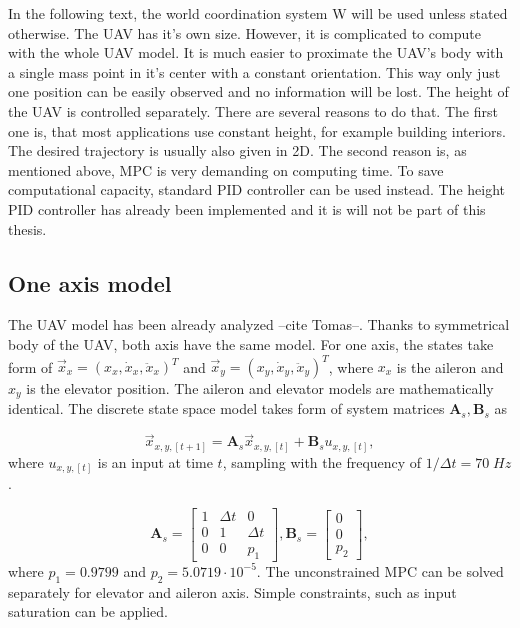 \documentclass{article}
\begin{document}
In the following text, the world coordination system W will be used unless stated otherwise. 
The UAV has it's own size. However, it is complicated to compute with the whole UAV model. It is much easier to proximate the UAV's body with a single mass point in it's center with a constant orientation. This way only just one position can be easily observed and no information will be lost.  The height of the UAV is controlled separately. There are several reasons to do that. The first one is, that most applications use constant height, for example building interiors. The desired trajectory is usually also given in 2D. The second reason is, as mentioned above, MPC is very demanding on computing time. To save computational capacity, standard PID controller can be used instead. The height PID controller has already been implemented \cite{tomas} and it is will not be part of this thesis. 

\subsection{One axis model}
The UAV model has been already analyzed --cite Tomas--. Thanks to symmetrical body of the UAV, both axis have the same model. For one axis, the states take form of 
$\vec{x}_x = (x_x, \dot{x}_x, \ddot{x}_x)^T$ and $\vec{x}_y = (x_y, \dot{x}_y, \ddot{x}_y)^T$, where $x_x$ is the aileron and $x_y$ is the elevator position. The aileron and elevator models are mathematically identical. The discrete state space model takes form of system matrices $\textbf{A}_s, \textbf{B}_s$ as

\begin{equation}
\label{eq:state_space_model_simple}
\vec{x}_{x,y,[t+1]} = \textbf{A}_{s} \vec{x}_{x,y, [t]} +\textbf{B}_{s} u_{x,y, [t]},
\end{equation} 
where $u_{x,y,[t]}$ is an input at time $t$, sampling with the frequency of $1/\Delta t = 70\;Hz$.




\begin{equation}
\textbf{A}_{s} =
  \begin{bmatrix}
  1 & \Delta t & 		0 \\
  0 & 		 1 & \Delta t \\
  0	& 		 0 &		p_1
  \end{bmatrix},\textbf{B}_{s} = \begin{bmatrix}
  0 \\
  0 \\
  p_2
  \end{bmatrix}, 
\end{equation}
where $p_1 = 0.9799$ and $p_2 = 5.0719\cdot10^{-5}$. The unconstrained MPC can be solved separately for elevator and aileron axis. Simple constraints, such as input saturation can be applied.
\end{document}
